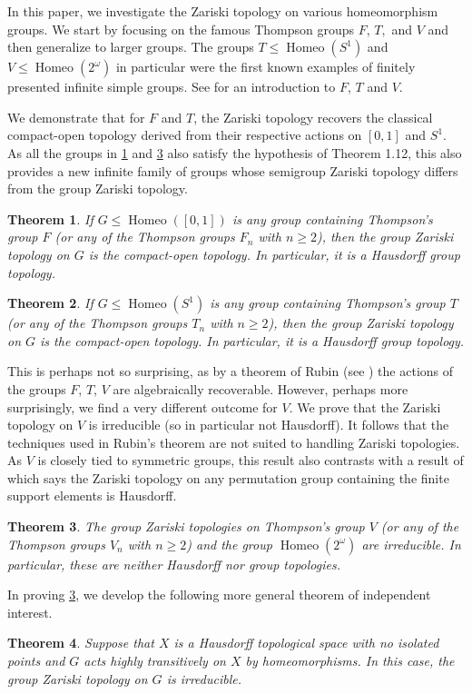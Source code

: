 \documentclass[11pt]{amsart}
\newtheorem{theorem}{Theorem}[section]
\newcommand{\Homeo}{\operatorname{Homeo}}
\begin{document}
In this paper, we investigate the Zariski topology on various homeomorphism groups. 
We start by focusing on the famous Thompson groups $F$, $T,$ and $V$ and then generalize to larger groups. The groups \(T\leq \operatorname{Homeo}(S^1)\) and \(V\leq \operatorname{Homeo}(2^\omega)\) in particular were the first known examples of finitely presented infinite simple groups.
See \cite{cannon1996introductory} for an introduction to \(F\), \(T\) and \(V\).

We demonstrate that for $F$ and $T$, the Zariski topology recovers the classical compact-open topology derived from their respective actions on $[0,1]$ and $S^1$. As all the groups in  \cref{mainF} and \cref{mainV} also satisfy the hypothesis of \cite{bardyla2025note} Theorem 1.12, this also provides a new infinite family of groups whose semigroup Zariski topology differs from the group Zariski topology.

\begin{theorem}\label{mainF}
    If \(G\leq \Homeo([0,1])\) is any group containing Thompson's group \(F\) (or any of the Thompson groups \(F_n\) with \(n\geq 2\)), then the group Zariski topology on \(G\) is the compact-open topology. In particular, it is a Hausdorff group topology.
\end{theorem}

\begin{theorem}\label{mainT}
    If \(G\leq \Homeo(S^1)\) is any group containing Thompson's group \(T\) (or any of the Thompson groups \(T_n\) with \(n\geq 2\)), then the group Zariski topology on \(G\) is the compact-open topology. In particular, it is a Hausdorff group topology.
\end{theorem}

This is perhaps not so surprising, as by a theorem of Rubin (see \cite{rubin1989reconstruction,belk2025short}) the actions of the groups \(F\), \(T\), \(V\) are algebraically recoverable.
However, perhaps more surprisingly, we find a very different outcome for $V$. 
We prove that the Zariski topology on $V$ is irreducible (so in particular not Hausdorff). 
It follows that the techniques used in Rubin's theorem are not suited to handling Zariski topologies.
As \(V\) is closely tied to symmetric groups, this result also contrasts with a result of  \cite{banakh2012algebraically} which says the Zariski topology on any permutation group containing the finite support elements is Hausdorff.


\begin{theorem}\label{mainV}
    The group Zariski topologies on Thompson's group  \(V\) (or any of the Thompson groups \(V_n\) with \(n\geq 2\)) and the group \(\operatorname{Homeo}(2^\omega)\) are irreducible. In particular, these are neither Hausdorff nor group topologies.
\end{theorem}
In proving \cref{mainV}, we develop the following more general theorem of independent interest.
\begin{theorem}\label{maingeneral}
    Suppose that \(X\) is a Hausdorff topological space with no isolated points and \(G\) acts highly transitively on \(X\) by homeomorphisms.
    In this case, the group Zariski topology on \(G\) is irreducible.
\end{theorem}
\end{document}
